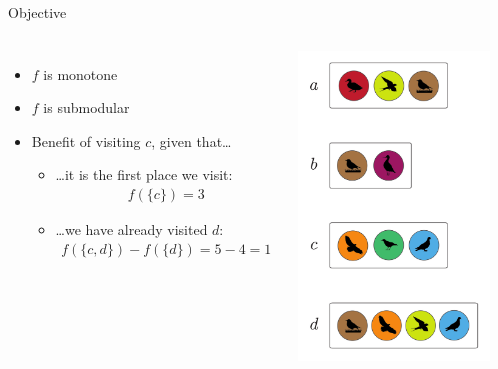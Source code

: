 \documentclass[xetex,10pt,mathserif]{beamer}
\begin{document}
\begin{frame}{Objective}
\begin{columns}[c]
\begin{itemize}
\item<1-> $f$ is monotone
\vspace{2em}
\item<2-> $f$ is submodular
\vspace{2em}
\item<3-> Benefit of visiting $c$, given that\ldots
\begin{itemize}
\vspace{1em}
\item<4-> \ldots it is the first place we visit:
\begin{align*}
  f(\{c\}) = 3
\end{align*}
\item<5-> \ldots we have already visited $d$:
\begin{align*}
  f(\{c, d\}) - f(\{d\}) = 5 - 4 = 1
\end{align*}
\end{itemize}
\end{itemize}
\centering
\includegraphics[width=2in]{figures/sets.pdf}
\end{columns}
\end{frame}
\end{document}

